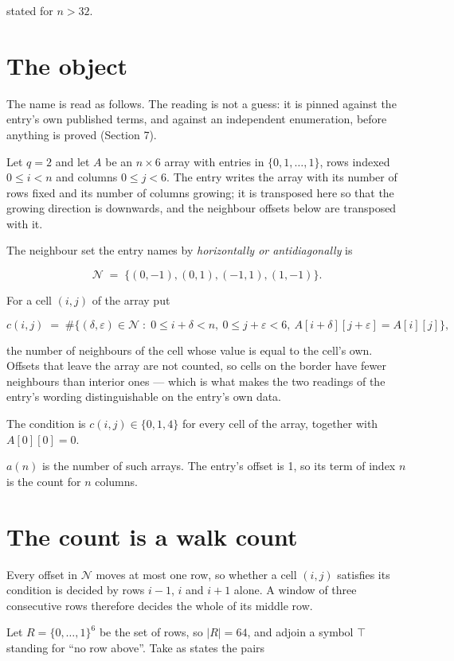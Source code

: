 \documentclass[11pt]{article}
\theoremstyle{definition}
\begin{document}
stated for $n > 32$.

\section{The object}

The name is read as follows. The reading is not a guess: it is pinned against the entry's own published terms, and against an independent enumeration, before anything is proved (Section 7).

Let $q = 2$ and let $A$ be an $n \times 6$ array with entries in $\{0,1,\dots,1\}$, rows indexed $0 \le i < n$ and columns $0 \le j < 6$. The entry writes the array with its number of rows fixed and its number of columns growing; it is transposed here so that the growing direction is downwards, and the neighbour offsets below are transposed with it.

The neighbour set the entry names by {\itshape horizontally or antidiagonally} is

\[\mathcal{N} \;=\; \{(0,-1), (0,1), (-1,1), (1,-1)\}.\]

For a cell $(i,j)$ of the array put

\[c(i,j) \;=\; \#\bigl\{(\delta,\varepsilon)\in\mathcal{N} \;:\; 0\le i+\delta<n,\ 0\le j+\varepsilon<6,\ A[i+\delta][j+\varepsilon] = A[i][j]\bigr\},\]

the number of neighbours of the cell whose value is equal to the cell's own. Offsets that leave the array are not counted, so cells on the border have fewer neighbours than interior ones --- which is what makes the two readings of the entry's wording distinguishable on the entry's own data.

The condition is $c(i,j) \in \{0, 1, 4\}$ for every cell of the array, together with $A[0][0]=0$.

$a(n)$ is the number of such arrays. The entry's offset is 1, so its term of index $n$ is the count for $n$ columns.

\section{The count is a walk count}

Every offset in $\mathcal{N}$ moves at most one row, so whether a cell $(i,j)$ satisfies its condition is decided by rows $i-1$, $i$ and $i+1$ alone. A window of three consecutive rows therefore decides the whole of its middle row.

Let $R = \{0,\dots,1\}^{6}$ be the set of rows, so $|R| = 64$, and adjoin a symbol $\top$ standing for ``no row above''. Take as states the pairs
\end{document}
